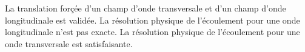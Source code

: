 La translation forçée d'un champ d'onde transversale et d'un champ d'onde longitudinale est validée. La résolution physique de l'écoulement pour une onde longitudinale n'est pas exacte. La résolution physique de l'écoulement pour une onde transversale est satisfaisante.